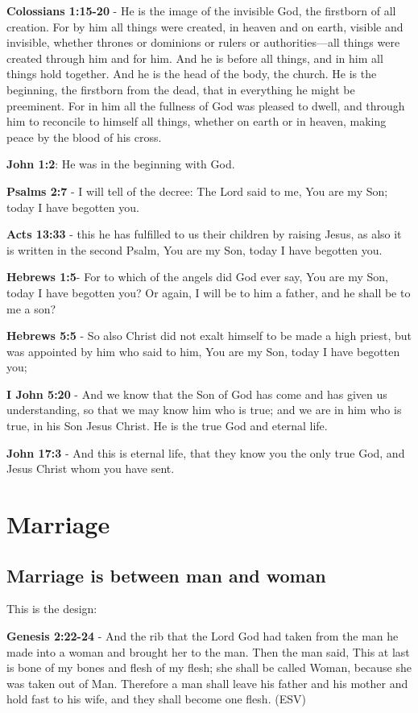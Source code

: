 \documentclass[11pt]{article}
\begin{document}
\textbf{Colossians 1:15-20} - He is the image of the invisible God, the firstborn of all creation. For by him all things were created, in heaven and on earth, visible and invisible, whether thrones or dominions or rulers or authorities—all things were created through him and for him. And he is before all things, and in him all things hold together. And he is the head of the body, the church. He is the beginning, the firstborn from the dead, that in everything he might be preeminent. For in him all the fullness of God was pleased to dwell, and through him to reconcile to himself all things, whether on earth or in heaven, making peace by the blood of his cross.

\textbf{John 1:2}: He was in the beginning with God.

\textbf{Psalms 2:7} - I will tell of the decree: The Lord said to me, You are my Son; today I have begotten you.

\textbf{Acts 13:33} - this he has fulfilled to us their children by raising Jesus, as also it is written in the second Psalm, You are my Son, today I have begotten you.

\textbf{Hebrews 1:5}- For to which of the angels did God ever say, You are my Son, today I have begotten you? Or again, I will be to him a father, and he shall be to me a son?

\textbf{Hebrews 5:5} - So also Christ did not exalt himself to be made a high priest, but was appointed by him who said to him, You are my Son, today I have begotten you;

\textbf{I John 5:20} - And we know that the Son of God has come and has given us understanding, so that we may know him who is true; and we are in him who is true, in his Son Jesus Christ. He is the true God and eternal life.

\textbf{John 17:3} - And this is eternal life, that they know you the only true God, and Jesus Christ whom you have sent.

\section{Marriage}
\label{sec:orgddf6598}
\subsection{Marriage is between man and woman}
\label{sec:orge3805d8}
This is the design:

\textbf{Genesis 2:22-24} - And the rib that the Lord God had taken from the man he made into a woman and brought her to the man. Then the man said, This at last is bone of my bones and flesh of my flesh; she shall be called Woman, because she was taken out of Man. Therefore a man shall leave his father and his mother and hold fast to his wife, and they shall become one flesh. (ESV)
\end{document}
